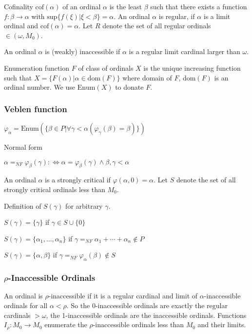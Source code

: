 \documentclass[10pt]{article}
\begin{document}
Cofinality \(\text{cof}(\alpha)\) of an ordinal \(\alpha\) is the least \(\beta\) such that there exists a function \(f:\beta\rightarrow\alpha\) with \(\text{sup}\{f(\xi )|\xi <\beta \}=\alpha\). An ordinal \(\alpha\) is regular, if \(\alpha\) is a limit ordinal and \(\text{cof}(\alpha)=\alpha\). Let \(R\) denote the set of all regular ordinals \(\in(\omega, M_0)\). 

An ordinal \(\alpha\) is (weakly) inaccessible if \(\alpha\) is a regular limit cardinal larger than \(\omega\).

Enumeration function \(F\) of class of ordinals \(X\) is the unique increasing function such that \(X=\{F(\alpha)|\alpha\in\text{dom}(F)\}\) where domain of \(F\), \(\text{dom}(F)\) is an ordinal number. We use \(\text{Enum}(X)\) to donate \(F\).


\subsubsection{Veblen function}

\(\varphi_\alpha=\text{Enum}(\{\beta\in P|\forall\gamma<\alpha(\varphi_\gamma(\beta)=\beta)\})\)

Normal form

\(\alpha=_{NF}\varphi_\beta(\gamma):\Leftrightarrow\alpha=\varphi_\beta(\gamma)\wedge\beta,\gamma<\alpha\)

An ordinal \(\alpha\) is a strongly critical if \(\varphi(\alpha,0)=\alpha\). Let \(S\) denote the set of
all strongly critical ordinals less than \(M_0\).

Definition of \(S(\gamma)\) for arbitrary \(\gamma\).

\(S(\gamma)=\{\gamma\}\) if \(\gamma\in S\cup\{0\}\)

\(S(\gamma)=\{\alpha_1,...,\alpha_n\}\) if \(\gamma=_{NF}\alpha_1+\cdots+\alpha_n\notin P\)

\(S(\gamma)=\{\alpha,\beta\}\) if \(\gamma=_{NF}\varphi_\alpha(\beta)\notin S\)


\subsubsection{\(\rho\)-Inaccessible Ordinals}

An ordinal is \(\rho\)-inaccessible if it is a regular cardinal and limit of \(\alpha\)-inaccessible ordinals for all \(\alpha<\rho\). So the 0-inaccessible ordinals are exactly the regular cardinals \(>\omega\), the 1-inaccessible ordinals are the inaccessible ordinals. Functions \(I_\rho:M_0 \rightarrow M_0\) enumerate the \(\rho\)-inaccessible ordinals less than \(M_0\) and their limits.
\end{document}

